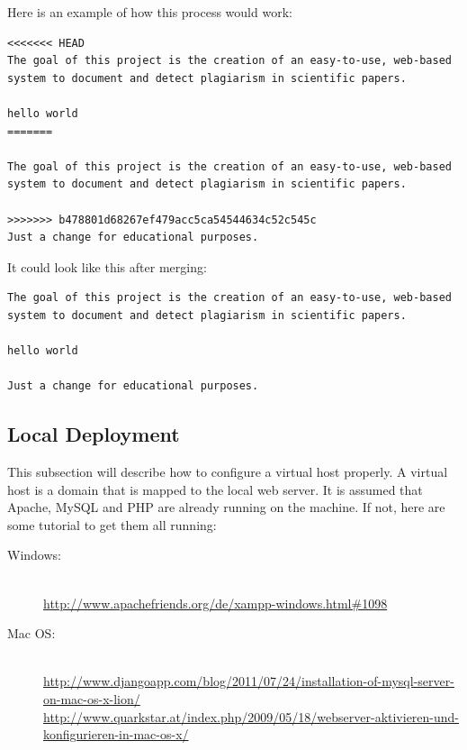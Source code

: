 Here is an example of how this process would work:

\begin{lstlisting}[caption=Conflicted file, keywordstyle=\color{black}]
<<<<<<< HEAD
The goal of this project is the creation of an easy-to-use, web-based
system to document and detect plagiarism in scientific papers.

hello world
=======

The goal of this project is the creation of an easy-to-use, web-based
system to document and detect plagiarism in scientific papers.

>>>>>>> b478801d68267ef479acc5ca54544634c52c545c
Just a change for educational purposes.
\end{lstlisting}

It could look like this after merging:


\begin{lstlisting}[caption=Fixed conflict after merging, keywordstyle=\color{black}]
The goal of this project is the creation of an easy-to-use, web-based
system to document and detect plagiarism in scientific papers.

hello world

Just a change for educational purposes.
\end{lstlisting}

\subsection{Local Deployment}

This subsection will describe how to configure a virtual host properly. A virtual host is a domain that is mapped to 
the local web server. It is assumed that Apache, MySQL and PHP are already running on the machine. If not, here are 
some tutorial to get them all running:

\begin{description}
\item [Windows:] \hfill \\
 \url{http://www.apachefriends.org/de/xampp-windows.html#1098}
\item [Mac OS:] \hfill \\
\url{http://www.djangoapp.com/blog/2011/07/24/installation-of-mysql-server-on-mac-os-x-lion/} \\
\url{http://www.quarkstar.at/index.php/2009/05/18/webserver-aktivieren-und-konfigurieren-in-mac-os-x/}
\end{description}

